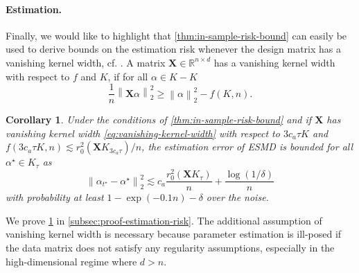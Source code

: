 \documentclass[a4paper]{article}
\newcommand{\norm}[1]{\left\|#1\right\|}
\newcommand{\X}[0]{\mathbf{X}}
\newcommand{\RR}[0]{\mathbb{R}}
\newcommand{\alphastar}{\alpha^\star}
\newcommand{\alphatstar}[0]{\alpha_{t^\star}}
\newcommand{\Kt}[0]{K_\tau}
\newcommand{\rzero}[0]{r_{0}}
\theoremstyle{thmstyle}
\newtheorem{corollary}{Corollary}
\theoremstyle{defstyle}
\theoremstyle{remark}
\begin{document}
\paragraph{Estimation.} Finally, we would like to highlight that \cref{thm:in-sample-risk-bound} can easily be used to derive bounds on the estimation risk
whenever the design matrix has a vanishing kernel width, cf. \cite{Raskutti2011}.
A matrix $\X\in\RR^{n\times d}$ has a vanishing kernel width with respect to $f$ and $K$, if for all $\alpha\in K-K$
\begin{equation}
\label{eq:vanishing-kernel-width}
    \frac{1}{n}\norm{\X\alpha}_2^2\geq \norm{\alpha}_2^2-f(K,n).
\end{equation}
\begin{corollary}
\label{cor:estimation-risk}
    Under the conditions of \cref{thm:in-sample-risk-bound} and if $\X$ has vanishing kernel width \eqref{eq:vanishing-kernel-width} with respect to $3c_a\tau K$ and $f(3c_a\tau K,n)\lesssim \rzero^2(\X K_{3c_a\tau })/n$,
    the estimation error of ESMD is bounded for all $\alphastar\in \Kt$ as
    \begin{equation*}
        \norm{\alphatstar-\alphastar}_2^2 \lesssim  c_a\frac{ \rzero^2(\X \Kt)}{n}+\frac{\log(1/\delta)}{n}
    \end{equation*}
    with probability at least $1-\exp(-0.1n)-\delta$ over the noise.
\end{corollary}
\noindent We prove \cref{cor:estimation-risk} in \cref{subsec:proof-estimation-risk}. The additional assumption of vanishing kernel width is necessary because parameter estimation is ill-posed if the data matrix does not satisfy any regularity assumptions, especially in the high-dimensional regime where $d>n$. 
\end{document}
